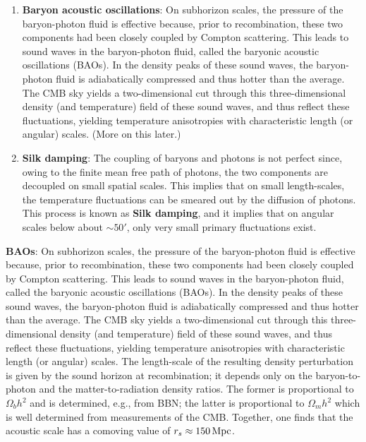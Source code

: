 \documentclass[a4paper,11pt]{article}
\begin{document}
\begin{enumerate}
    \item \textbf{Baryon acoustic oscillations}: On subhorizon scales, the pressure of the baryon-photon fluid is effective because, prior to recombination, these two components had been closely coupled by Compton scattering. This leads to sound waves in the baryon-photon fluid, called the baryonic acoustic oscillations (BAOs). In the density peaks of these sound waves, the baryon-photon fluid is adiabatically compressed and thus hotter than the average. The CMB sky yields a two-dimensional cut through this three-dimensional density (and temperature) field of these sound waves, and thus reflect these fluctuations, yielding temperature anisotropies with characteristic length (or angular) scales. (More on this later.)
    \item \textbf{Silk damping}: The coupling of baryons and photons is not perfect since, owing to the finite mean free path of photons, the two components are decoupled on small spatial scales. This implies that on small length-scales, the temperature fluctuations can be smeared out by the diffusion of photons. This process is known as \textbf{Silk damping}, and it implies that on angular scales below about $\sim50'$, only very small primary fluctuations exist.
\end{enumerate}

{\noindent}\textbf{BAOs}: On subhorizon scales, the pressure of the baryon-photon fluid is effective because, prior to recombination, these two components had been closely coupled by Compton scattering. This leads to sound waves in the baryon-photon fluid, called the baryonic acoustic oscillations (BAOs). In the density peaks of these sound waves, the baryon-photon fluid is adiabatically compressed and thus hotter than the average. The CMB sky yields a two-dimensional cut through this three-dimensional density (and temperature) field of these sound waves, and thus reflect these fluctuations, yielding temperature anisotropies with characteristic length (or angular) scales. The length-scale of the resulting density perturbation is given by the sound horizon at recombination; it depends only on the baryon-to-photon and the matter-to-radiation density ratios. The former is proportional to $\Omega_bh^2$ and is determined, e.g., from BBN; the latter is proportional to $\Omega_mh^2$ which is well determined from measurements of the CMB. Together, one finds that the acoustic scale has a comoving value of $r_s\approx150\,{\rm Mpc}$.
\end{document}
